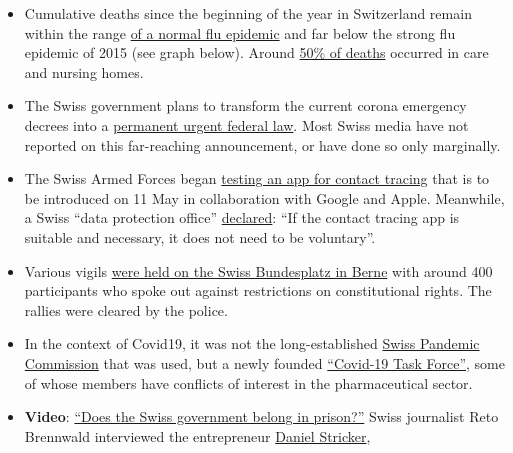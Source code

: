 \begin{itemize}
\tightlist
\item
  Cumulative deaths since the beginning of the year in Switzerland
  remain within the range
  \href{https://swprs.files.wordpress.com/2020/05/schweiz-todesfaelle-2010-2020_woche_17.pdf}{of
  a normal flu epidemic} and far below the strong flu epidemic of 2015
  (see graph below). Around
  \href{https://www.bluewin.ch/de/news/schweiz/sp-chef-levrat-will-die-reichen-schropfen-383977.html}{50\%
  of deaths} occurred in care and nursing homes.
\item
  The Swiss government plans to transform the current corona emergency
  decrees into a
  \href{https://www.admin.ch/gov/de/start/dokumentation/medienmitteilungen.msg-id-78929.html}{permanent
  urgent federal law}. Most Swiss media have not reported on this
  far-reaching announcement, or have done so only marginally.
\item
  The Swiss Armed Forces began
  \href{https://uncut-news.ch/wp-content/uploads/2020/05/Schweizer-Soldaten-k\%C3\%A4mpfen-bewaffnet-mit-Bluetooth-App-gegen-COVID-19.pdf}{testing
  an app for contact tracing} that is to be introduced on 11 May in
  collaboration with Google and Apple. Meanwhile, a Swiss ``data
  protection office''
  \href{https://www.nzz.ch/zuerich/coronavirus-in-zuerich-tracing-app-braucht-keine-freiwilligkeit-ld.1553964}{declared}:
  ``If the contact tracing app is suitable and necessary, it does not
  need to be voluntary''.
\item
  Various vigils
  \href{https://www.zeitpunkt.ch/index.php/mahnwache-fuer-grundrechte-400-menschen-auf-dem-bundesplatz-wie-aus-dem-nichts}{were
  held on the Swiss Bundesplatz in Berne} with around 400 participants
  who spoke out against restrictions on constitutional rights. The
  rallies were cleared by the police.
\item
  In the context of Covid19, it was not the long-established
  \href{https://www.srf.ch/news/schweiz/bag-verzichtete-auf-beratung-was-macht-die-pandemie-kommission-in-der-krise}{Swiss
  Pandemic Commission} that was used, but a newly founded
  \href{https://ncs-tf.ch/de/organisation}{``Covid-19 Task Force''},
  some of whose members have conflicts of interest in the pharmaceutical
  sector.
\item
  \textbf{Video}:
  \href{https://www.youtube.com/watch?v=RyZGkdeQ6CY}{``Does the Swiss
  government belong in prison?''} Swiss journalist Reto Brennwald
  interviewed the entrepreneur
  \href{https://www.youtube.com/user/timturpis/videos}{Daniel Stricker},

\end{itemize}
